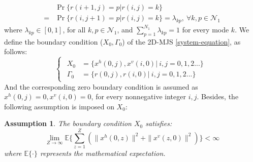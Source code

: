 \documentclass[journal,final,twocolumn]{IEEEtran}
\newtheorem{remark}{Remark}
\newtheorem{assumption}{Assumption}
\begin{document}
	\begin{equation}\label{tps_system}
	\begin{split}
	&\Pr\{r(i+1,j)=p|r(i,j)=k\}\\
	=&\Pr\{r(i,j+1)=p|r(i,j)=k\}=\lambda_{kp},\  \forall k,p \in \mathcal{N}_{1}
	\end{split}
	\end{equation}
	where $\lambda_{kp}\in[0,1]$, for all $k, p\in\mathcal{N}_{1}$, and $\sum_{p=1}^{N_1}\lambda_{kp}=1$ for every mode $k$.
	We define the boundary condition ($X_{0},\varGamma_{0}$) of the 2D-MJS \eqref{system-equation}, as follows:
	\begin{equation} \label{boundary-condition}
	\left\{
		\begin{array}{lr}
			\begin{split}
				X_{0} &= \{x^{h}(0,j),x^{v}(i,0)|\ i,j = 0,1,2...\}\\
				\varGamma_{0} &= \{r(0,j), r(i,0)|\ i,j = 0,1,2... \}
			\end{split}
		\end{array}
	\right.
	\end{equation}
	And the corresponding zero boundary condition is assumed as $x^{h}(0,j) =0, x^{v}(i,0)=0$, for every nonnegative integer $i,j$. Besides, the following assumption is imposed on $X_{0}$:
	
	\begin{assumption}\label{boundary-assumptin}
	 	The boundary condition $X_{0}$ satisfies:
	 	\begin{equation}
	 		\lim\limits_{Z\to\infty}\mathbb{E}\Big\{\sum_{z=1}^{Z}(\|x^{h}(0,z)\|^{2}+ \|x^{v}(z,0)\|^{2})\Big\} < \infty
	 	\end{equation}
	 	where $\mathbb{E}\{\cdot\}$ represents the mathematical expectation.
	\end{assumption}
	
\end{document}
